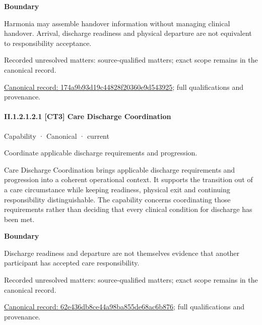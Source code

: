 \textbf{Boundary}



Harmonia may assemble handover information without managing clinical handover. Arrival, discharge readiness and physical departure are not equivalent to responsibility acceptance.


{\small Recorded unresolved matters: source-qualified matters; exact scope remains in the canonical record.}\par
{\footnotesize \href{../../../../continuum/strategy/capability/174a9b93d19c44828f20360e9d543925.md}{Canonical record: 174a9b93d19c44828f20360e9d543925}; full qualifications and provenance.}\par
\paragraph*{II.1.2.1.2.1 [CT3] Care Discharge Coordination}
\label{navigation:II.1.2.1.2.1}

\label{element:62e436db8ce44a98ba855de68ac6b876}
{\small Capability · Canonical · current}\par

Coordinate applicable discharge requirements and progression.



Care Discharge Coordination brings applicable discharge requirements and progression into a coherent operational context. It supports the transition out of a care circumstance while keeping readiness, physical exit and continuing responsibility distinguishable. The capability concerns coordinating those requirements rather than deciding that every clinical condition for discharge has been met.



\textbf{Boundary}



Discharge readiness and departure are not themselves evidence that another participant has accepted care responsibility.


{\small Recorded unresolved matters: source-qualified matters; exact scope remains in the canonical record.}\par
{\footnotesize \href{../../../../continuum/strategy/capability/62e436db8ce44a98ba855de68ac6b876.md}{Canonical record: 62e436db8ce44a98ba855de68ac6b876}; full qualifications and provenance.}\par
